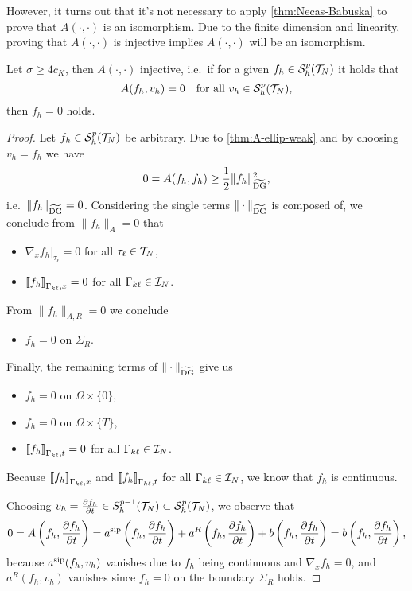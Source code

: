 \documentclass[../thesis.tex]{subfiles}
\begin{document}
However, it turns out that it's not necessary to apply \cref{thm:Necas-Babuska} to prove that $A(\cdot, \cdot)$ is an isomorphism. Due to the finite dimension and linearity, proving that $A(\cdot, \cdot)$ is injective implies $A(\cdot, \cdot)$ will be an isomorphism.
\begin{theorem}
\label{thm:A-injective}
Let $\sigma \geq 4 c_K$, then $A(\cdot, \cdot)$ injective, i.e.\ if for a given $f_h \in \mathcal{S}_h^p(\mathcal{T}_N)$ it holds that
\[
	A(f_h, v_h) = 0 \quad \text{for all } v_h \in \mathcal{S}_h^p(\mathcal{T}_N),
\]
then $f_h = 0$ holds.
\end{theorem}
\begin{proof}
Let $f_h \in \mathcal{S}_h^p(\mathcal{T}_N)$ be arbitrary.
Due to \cref{thm:A-ellip-weak} and by choosing $v_h = f_h$ we have
\[
	0 = A(f_h, f_h) \geq \frac{1}{2} \| f_h \|_{\widetilde{\mathrm{DG}}}^2,
\]
i.e.\ $\| f_h \|_{\widetilde{\mathrm{DG}}} = 0$. Considering the single terms $\| \cdot \|_{\widetilde{\mathrm{DG}}}$ is composed of, we conclude from $\| f_h \|_A = 0$ that
\begin{itemize}
	\item $\nabla_x f_h |_{\tau_\ell} = 0$ for all $\tau_\ell \in \mathcal{T}_N$,
	\item ${\lbrack\!\lbrack} f_h {\rbrack\!\rbrack}_{\Gamma_{k\ell}, x} = 0$ for all $\Gamma_{k\ell} \in \mathcal{I}_N$.
\end{itemize}
From $\| f_h \|_{A, R} = 0$ we conclude
\begin{itemize}
	\item $f_h = 0$ on $\Sigma_R$.
\end{itemize}
Finally, the remaining terms of $\| \cdot \|_{\widetilde{\mathrm{DG}}}$ give us
\begin{itemize}
	\item $f_h = 0$ on $\Omega \times \{ 0 \}$,
	\item $f_h = 0$ on $\Omega \times \{ T \}$,
	\item ${\lbrack\!\lbrack} f_h {\rbrack\!\rbrack}_{\Gamma_{k\ell}, t} = 0$ for all $\Gamma_{k\ell} \in \mathcal{I}_N$.
\end{itemize}
Because ${\lbrack\!\lbrack} f_h {\rbrack\!\rbrack}_{\Gamma_{k\ell}, x}$ and ${\lbrack\!\lbrack} f_h {\rbrack\!\rbrack}_{\Gamma_{k\ell}, t}$ for all $\Gamma_{k\ell} \in \mathcal{I}_N$, we know that $f_h$ is continuous.

Choosing $v_h = \frac{\partial f_h}{\partial t} \in S_h^{p-1}(\mathcal{T}_N) \subset \mathcal{S}_h^p(\mathcal{T}_N)$, we observe that
\[
	0 = A \left(f_h, \frac{\partial f_h}{\partial t}\right) = a^{\mathrm{sip}} \left(f_h,  \frac{\partial f_h}{\partial t}\right) + a^R \left(f_h,  \frac{\partial f_h}{\partial t}\right) + b\left(f_h,  \frac{\partial f_h}{\partial t}\right) = b\left(f_h,  \frac{\partial f_h}{\partial t}\right),
\]
because $a^{\mathrm{sip}}(f_h, v_h)$ vanishes due to $f_h$ being continuous and $\nabla_x f_h = 0$, and $a^R(f_h, v_h)$ vanishes since $f_h = 0$ on the boundary $\Sigma_R$ holds.


\end{proof}
\end{document}
